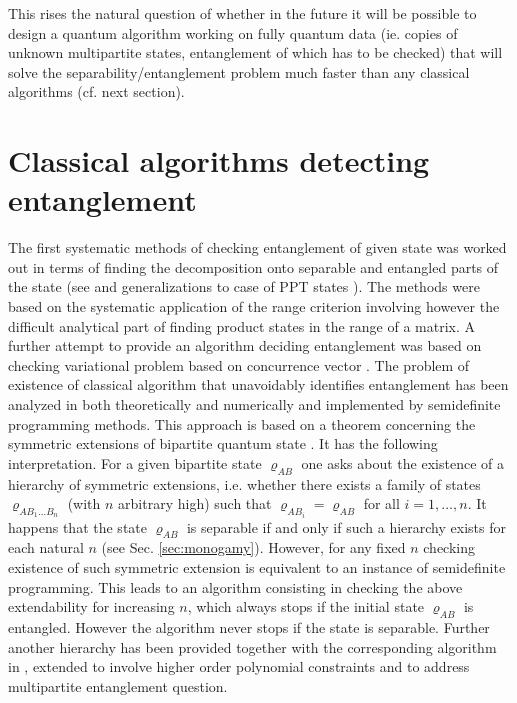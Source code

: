 \documentclass[rmp,12pt,preprint]{revtex4-2}
\begin{document}
This rises the natural question of whether in the future it will be
possible to design a quantum algorithm working on fully quantum data
(ie. copies of unknown multipartite states, entanglement of which has
to be checked) that will solve the separability/entanglement problem
much faster than any classical algorithms (cf. next section).



\section{Classical algorithms detecting entanglement}
\label{sec:alg_ent}

The first systematic methods of checking entanglement of given state
was worked out in terms of finding the decomposition onto separable
and entangled parts of the state (see \cite{LewensteinSanpera-bsa} and
generalizations to case of PPT states \cite{Karnas,Lewenstein00b}).
The methods were based on the systematic application of the range
criterion involving however the difficult analytical part of finding
product states in the range of a matrix. A further attempt to provide
an algorithm deciding entanglement was based on checking variational
problem based on concurrence vector
\cite{AudenaertVM2000-concurrence}. The problem of existence of
classical algorithm that unavoidably identifies entanglement has been
analyzed in \cite{DohertyAlgorithm1,DohertyAlgorithm2} both
theoretically and numerically and implemented by semidefinite
programming methods.  This approach is based on a theorem concerning
the symmetric extensions of bipartite quantum state
\cite{FannesEtAlSEP,RaggioWernerSEP}. It has the following
interpretation. For a given bipartite state $\varrho_{AB}$ one asks
about the existence of a hierarchy of symmetric extensions, i.e.
whether there exists a family of states $\varrho_{AB_{1}...B_{n}}$
(with $n$ arbitrary high) such that $\varrho_{AB_{i}}=\varrho_{AB}$
for all $i=1,\ldots,n$. It happens that the state $\varrho_{AB}$ is
separable if and only if such a hierarchy exists for each natural $n$
(see Sec. \ref{sec:monogamy}). However, for any fixed $n$ checking
existence of such symmetric extension is equivalent to an instance of
semidefinite programming. This leads to an algorithm consisting in
checking the above extendability for increasing $n$, which always
stops if the initial state $\varrho_{AB}$ is entangled. However the
algorithm never stops if the state is separable. Further another
hierarchy has been provided together with the corresponding algorithm
in \cite{EisertAlgorithm}, extended to involve higher order polynomial
constraints and to address multipartite entanglement question.
\end{document}
